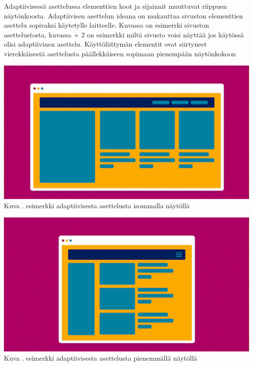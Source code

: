 \documentclass[11pt,a4paper,titlepage,oneside]{article}
\begin{document}
Adaptiivisessä asettelussa elementtien koot ja sijainnit muuttuvat riippuen näytönkoosta.
Adaptiivisen asettelun ideana on mukauttaa sivuston elementtien asettelu sopivaksi käytetylle laitteelle.
Kuvassa \nextImageCount {} on esimerrki sivuston asettelustosta, kuvassa {\the\numexpr \theimgCounter + 2 } on esimerkki miltä sivusto voisi näyttää jos käytössä olisi adaptiivinen asettelu.
Käyttöliittymän elementit ovat siirtyneet vierekkäisestä asettelusta päällekkäiseen sopimaan pienempään näytönkokoon
\medskip

\bigskip

\includegraphics[width = 15cm]{src/public/oppar/adaptiveBig.png}\\
Kuva \getImgCount {}. esimerkki adaptiivisesta asettelusta isommalla näytöllä 
 
\bigskip

\includegraphics[width = 15cm]{src/public/oppar/adaptivesmall.png}\\
Kuva \getImgCount {}. esimerkki adaptiivisesta asettelusta pienemmällä näytöllä
\end{document}
